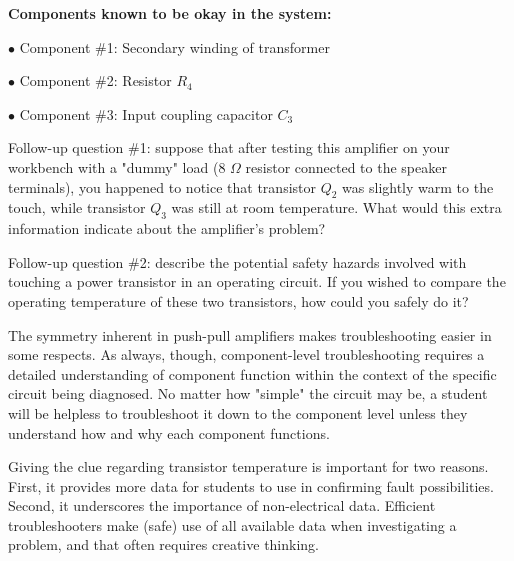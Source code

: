 \vskip 10pt

\medskip
\item{} {\bf Components known to be okay in the system:}
\item{$\bullet$} Component \#1: Secondary winding of transformer
\item{$\bullet$} Component \#2: Resistor $R_4$
\item{$\bullet$} Component \#3: Input coupling capacitor $C_3$
\medskip

\vskip 10pt

Follow-up question \#1: suppose that after testing this amplifier on your workbench with a "dummy" load (8 $\Omega$ resistor connected to the speaker terminals), you happened to notice that transistor $Q_2$ was slightly warm to the touch, while transistor $Q_3$ was still at room temperature.  What would this extra information indicate about the amplifier's problem?

\vskip 10pt

Follow-up question \#2: describe the potential safety hazards involved with touching a power transistor in an operating circuit.  If you wished to compare the operating temperature of these two transistors, how could you safely do it?







The symmetry inherent in push-pull amplifiers makes troubleshooting easier in some respects.  As always, though, component-level troubleshooting requires a detailed understanding of component function within the context of the specific circuit being diagnosed.  No matter how "simple" the circuit may be, a student will be helpless to troubleshoot it down to the component level unless they understand how and why each component functions.

Giving the clue regarding transistor temperature is important for two reasons.  First, it provides more data for students to use in confirming fault possibilities.  Second, it underscores the importance of non-electrical data.  Efficient troubleshooters make (safe) use of all available data when investigating a problem, and that often requires creative thinking.




